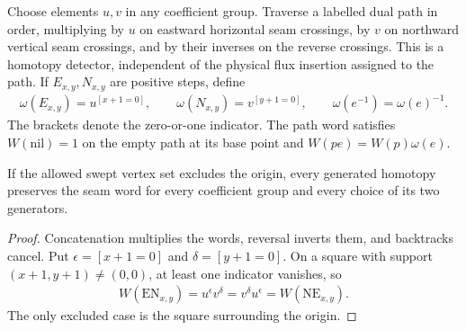 \begin{definition}
    \label{def:peps_dual_nonabelian_seam_word}
    \leanok
    Choose elements $u,v$ in any coefficient group. Traverse a labelled dual path
    in order, multiplying by $u$ on eastward horizontal seam crossings,
    by $v$ on northward vertical seam crossings, and by their inverses
    on the reverse crossings. This is a homotopy detector, independent
    of the physical flux insertion assigned to the path. If $E_{x,y},N_{x,y}$
    are positive steps, define
    \begin{align}
        \omega(E_{x,y})=u^{[x+1=0]},\qquad
        \omega(N_{x,y})=v^{[y+1=0]},\qquad
        \omega(e^{-1})=\omega(e)^{-1}.
        \label{eq:peps_dual_seam_step_word}
    \end{align}
    The brackets denote the zero-or-one indicator. The path word satisfies
    $W(\mathrm{nil})=1$ on the empty path at its base point and
    $W(pe)=W(p)\omega(e)$.
\end{definition}

\begin{lemma}
    \label{lem:peps_dual_restricted_seam_word}
    \leanok
    If the allowed swept vertex set excludes the origin, every generated
    homotopy preserves the seam word for every coefficient group and every
    choice of its two generators.
\end{lemma}
\begin{proof}\leanok
    Concatenation multiplies the words, reversal inverts them, and
    backtracks cancel. Put $\epsilon=[x+1=0]$ and $\delta=[y+1=0]$.
    On a square with support $(x+1,y+1)\ne(0,0)$, at least one indicator
    vanishes, so
    \begin{align}
        W(\mathrm{EN}_{x,y})=u^\epsilon v^\delta
        =v^\delta u^\epsilon=W(\mathrm{NE}_{x,y}).
        \label{eq:peps_restricted_seam_square}
    \end{align}
    The only excluded case is the square surrounding the origin.
\end{proof}

